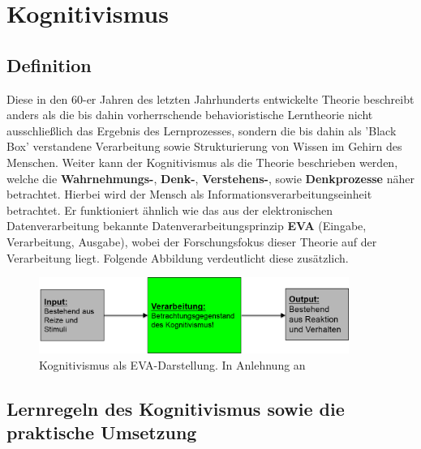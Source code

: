 \chapter{Kognitivismus}
\label{cha:Kognitivismus}

\section{Definition}\label{Definition Kognitivismus}

Diese in den 60-er Jahren des letzten Jahrhunderts entwickelte Theorie beschreibt anders als die bis dahin vorherrschende behavioristische Lerntheorie nicht ausschließlich das Ergebnis des Lernprozesses, sondern die bis dahin als 'Black Box' verstandene Verarbeitung sowie Strukturierung von Wissen im Gehirn des Menschen. \cite[S. 155]{Erpenbeck.2007} 
Weiter kann der Kognitivismus als die Theorie beschrieben werden, welche die \textbf{Wahrnehmungs-}, \textbf{Denk-}, \textbf{Verstehens-}, sowie \textbf{Denkprozesse} näher betrachtet. Hierbei wird der Mensch als Informationsverarbeitungseinheit betrachtet. Er funktioniert ähnlich wie das aus der elektronischen Datenverarbeitung bekannte Datenverarbeitungsprinzip \textbf{EVA} (Eingabe, Verarbeitung, Ausgabe), wobei der Forschungsfokus dieser Theorie auf der Verarbeitung liegt. Folgende Abbildung verdeutlicht diese zusätzlich. \cite{AnsgarA.PlassmannProf.Dr.GunterSchmitt.2007}

\begin{figure}[h]
	\centering
	\includegraphics[width=0.9\textwidth]{Abbildungen/Kognitivismus1.PNG}
	\caption{Kognitivismus als EVA-Darstellung. In Anlehnung an \cite[S. 12]{SusanneMeir.}}
	\label{fig:Kerres2001_Kopiermodell}
\end{figure}

\section{Lernregeln des Kognitivismus sowie die praktische Umsetzung}

